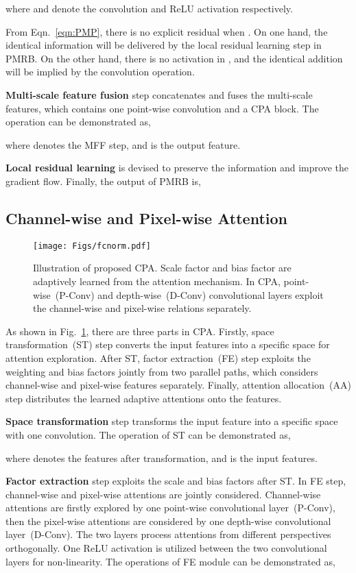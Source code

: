 \documentclass[journal]{IEEEtran}
\begin{document}
where  and  denote the convolution and ReLU activation respectively.

From Eqn.~\ref{eqn:PMP}, there is no explicit residual when . On one hand, the identical information will be delivered by the local residual learning step in PMRB. On the other hand, there is no activation in , and the identical addition will be implied by the convolution operation.



\textbf{Multi-scale feature fusion} step concatenates and fuses the multi-scale features, which contains one point-wise convolution and a CPA block.
The operation can be demonstrated as,

where  denotes the MFF step, and  is the output feature.

\textbf{Local residual learning} is devised to preserve the information and improve the gradient flow. 
Finally, the output of PMRB is,



\subsection{Channel-wise and Pixel-wise Attention}
\begin{figure}
	\centering
	\texttt{[image: Figs/fcnorm.pdf]}
	\caption{Illustration of proposed CPA. Scale factor  and bias factor  are adaptively learned from the attention mechanism. In CPA, point-wise~(P-Conv) and depth-wise~(D-Conv) convolutional layers exploit the channel-wise and pixel-wise relations separately.}
	\label{fig:FCNorm}
\end{figure}

As shown in Fig.~\ref{fig:FCNorm}, there are three parts in CPA. Firstly, space transformation~(ST) step converts the input features into a specific space for attention exploration. After ST, factor extraction~(FE) step exploits the weighting and bias factors jointly from two parallel paths, which considers channel-wise and pixel-wise features separately. Finally, attention allocation~(AA) step distributes the learned adaptive attentions onto the features.

\textbf{Space transformation} step transforms the input feature into a specific space with one convolution. The operation of ST can be demonstrated as,

where  denotes the features after transformation, and  is the input features.

\textbf{Factor extraction} step exploits the scale and bias factors after ST. In FE step, channel-wise and pixel-wise attentions are jointly considered.
Channel-wise attentions are firstly explored by one point-wise convolutional layer~(P-Conv), then the pixel-wise attentions are considered by one depth-wise convolutional layer~(D-Conv). The two layers process attentions from different perspectives orthogonally. One ReLU activation is utilized between the two convolutional layers for non-linearity. The operations of FE module can be demonstrated as,
\end{document}
